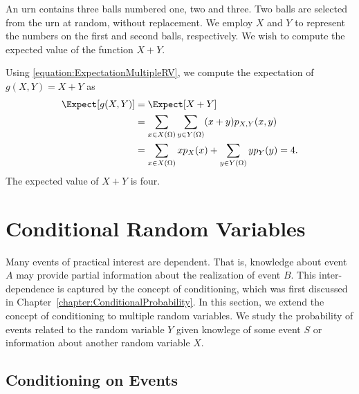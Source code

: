 \begin{example}
An urn contains three balls numbered one, two and three.
Two balls are selected from the urn at random, without replacement.
We employ $X$ and $Y$ to represent the numbers on the first and second balls, respectively.
We wish to compute the expected value of the function $X + Y$.

Using \eqref{equation:ExpectationMultipleRV}, we compute the expectation of $g(X,Y) = X + Y$ as
\begin{equation*}
\begin{split}
\Expect [g(X,Y)] &= \Expect [X + Y] \\
&= \sum_{x \in X(\Omega)} \sum_{y \in Y(\Omega)} (x + y) p_{X,Y} (x,y) \\
&= \sum_{x \in X(\Omega)} x p_X (x) + \sum_{y \in Y(\Omega)} y p_Y (y)
= 4.
\end{split}
\end{equation*}
The expected value of $X + Y$ is four.
\end{example}


\section{Conditional Random Variables}
\label{section:ConditionalRandomVariables}

Many events of practical interest are dependent.
That is, knowledge about event $A$ may provide partial information about the realization of event $B$.
This inter-dependence is captured by the concept of conditioning, which was first discussed in Chapter~\ref{chapter:ConditionalProbability}.
In this section, we extend the concept of conditioning to multiple random variables.
We study the probability of events related to the random variable $Y$ given knowlege of some event $S$ or information about another random variable $X$.


\subsection{Conditioning on Events}

